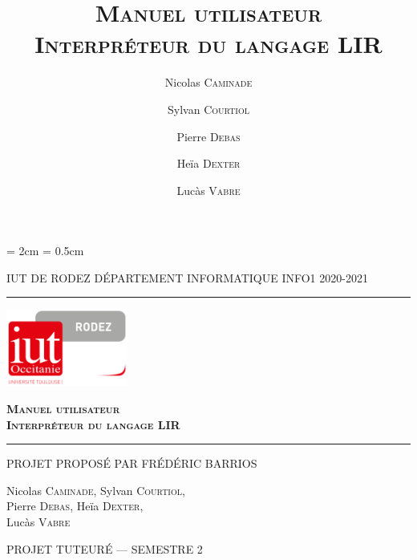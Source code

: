 \documentclass[11pt,a4paper,titlepage,openany,oneside]{book}
\title{\textsc{\textbf{Manuel utilisateur\\Interpréteur du langage LIR}}}
\date{}
\author{Nicolas \textsc{Caminade} \and
        Sylvan \textsc{Courtiol} \and
        Pierre \textsc{Debas} \and
        Heïa \textsc{Dexter} \and
        Lucàs \textsc{Vabre} }
\begin{document}
    \renewcommand\sfdefault{pag}

    \lhead{\leftmark}

    \cfoot{\thepage}
    \headheight = 2cm
    \headsep = 0.5cm

    \begin{titlepage}
        \selectfont

        \begin{center}\normalsize
            \MakeUppercase{IUT de Rodez \hfill Département informatique
                \hfill INFO1 2020-2021}
        \end{center}
        \vspace*{0.1cm}
        \hrule
        \vspace*{0.2cm}
        \begin{flushright}
            \includegraphics[width=4cm]{img/logoiut}
        \end{flushright}
        \vspace*{2cm}
        \begin{flushright}\Huge
            \textsc{\textbf{Manuel utilisateur\\Interpréteur du langage LIR}}
        \end{flushright}
        \hrule
        \begin{flushleft}
            \MakeUppercase{Projet proposé par Frédéric Barrios}
        \end{flushleft}
        \vspace*{2cm}
        \begin{center}\Large
            Nicolas \textsc{Caminade}, Sylvan \textsc{Courtiol},\\
            Pierre \textsc{Debas}, Heïa \textsc{Dexter}, \\
            Lucàs \textsc{Vabre}
        \end{center}
        \vfill
        \begin{center}\normalsize
            \MakeUppercase{Projet tuteuré --- Semestre 2}
        \end{center}
    \end{titlepage}
\end{document}
